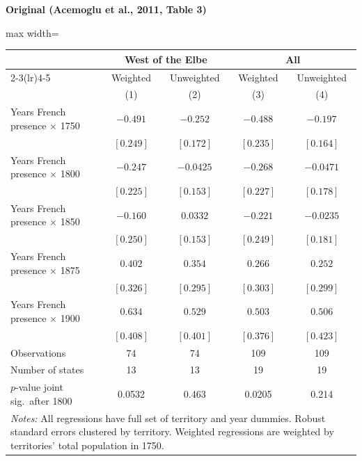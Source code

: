 \documentclass[11pt,a4paper]{article}
\begin{document}
\vspace{0.5cm}
\begin{minipage}[t]{0.48\textwidth}
\centering
\textbf{\large Original (Acemoglu et al., 2011, Table 3)}
\vspace{0.3cm}

\begin{adjustbox}{max width=\textwidth}
\begin{tabular}{lcccc}
\toprule
 & \multicolumn{2}{c}{West of the Elbe} & \multicolumn{2}{c}{All} \\
\cmidrule(lr){2-3}\cmidrule(lr){4-5}
 & Weighted & Unweighted & Weighted & Unweighted \\
 & (1) & (2) & (3) & (4) \\
\midrule
Years French presence $\times$ 1750 & $-0.491$ & $-0.252$ & $-0.488$ & $-0.197$ \\
 & $[0.249]$ & $[0.172]$ & $[0.235]$ & $[0.164]$ \\[0.3em]
Years French presence $\times$ 1800 & $-0.247$ & $-0.0425$ & $-0.268$ & $-0.0471$ \\
 & $[0.225]$ & $[0.153]$ & $[0.227]$ & $[0.178]$ \\[0.3em]
Years French presence $\times$ 1850 & $-0.160$ & $0.0332$ & $-0.221$ & $-0.0235$ \\
 & $[0.250]$ & $[0.153]$ & $[0.249]$ & $[0.181]$ \\[0.3em]
Years French presence $\times$ 1875 & $0.402$ & $0.354$ & $0.266$ & $0.252$ \\
 & $[0.326]$ & $[0.295]$ & $[0.303]$ & $[0.299]$ \\[0.3em]
Years French presence $\times$ 1900 & $0.634$ & $0.529$ & $0.503$ & $0.506$ \\
 & $[0.408]$ & $[0.401]$ & $[0.376]$ & $[0.423]$ \\[0.3em]
\midrule
Observations & 74 & 74 & 109 & 109 \\
Number of states & 13 & 13 & 19 & 19 \\
$p$-value joint sig.\ after 1800 & 0.0532 & 0.463 & 0.0205 & 0.214 \\
\bottomrule
\multicolumn{5}{p{0.95\textwidth}}{\footnotesize\textit{Notes:} All regressions have full set of territory and year dummies. Robust standard errors clustered by territory. Weighted regressions are weighted by territories' total population in 1750.}
\end{tabular}
\end{adjustbox}
\end{minipage}%
\hfill
\end{document}
